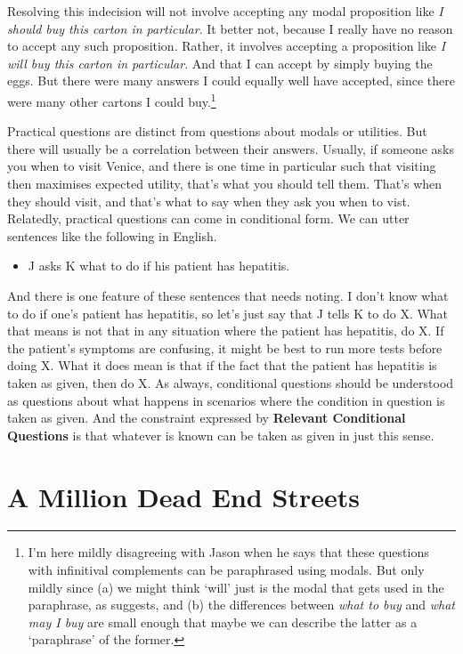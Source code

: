 \documentclass[11pt,]{book}
\providecommand{\tightlist}{%
  \setlength{\itemsep}{0pt}\setlength{\parskip}{0pt}}
\let\rmarkdownfootnote\footnote%
\def\footnote{\protect\rmarkdownfootnote}
\begin{document}
Resolving this indecision will not involve accepting any modal proposition like \emph{I should buy this carton in particular}. It better not, because I really have no reason to accept any such proposition. Rather, it involves accepting a proposition like \emph{I will buy this carton in particular}. And that I can accept by simply buying the eggs. But there were many answers I could equally well have accepted, since there were many other cartons I could buy.\footnote{I'm here mildly disagreeing with Jason \citet[Ch. 5]{Stanley2011} when he says that these questions with infinitival complements can be paraphrased using modals. But only mildly since (a) we might think `will' just is the modal that gets used in the paraphrase, as \citet{Bhatt1999} suggests, and (b) the differences between \emph{what to buy} and \emph{what may I buy} are small enough that maybe we can describe the latter as a `paraphrase' of the former.}

Practical questions are distinct from questions about modals or utilities. But there will usually be a correlation between their answers. Usually, if someone asks you when to visit Venice, and there is one time in particular such that visiting then maximises expected utility, that's what you should tell them. That's when they should visit, and that's what to say when they ask you when to vist. Relatedly, practical questions can come in conditional form. We can utter sentences like the following in English.

\begin{itemize}
\tightlist
\item
  J asks K what to do if his patient has hepatitis.
\end{itemize}

And there is one feature of these sentences that needs noting. I don't know what to do if one's patient has hepatitis, so let's just say that J tells K to do X. What that means is not that in any situation where the patient has hepatitis, do X. If the patient's symptoms are confusing, it might be best to run more tests before doing X. What it does mean is that if the fact that the patient has hepatitis is taken as given, then do X. As always, conditional questions should be understood as questions about what happens in scenarios where the condition in question is taken as given. And the constraint expressed by \textbf{Relevant Conditional Questions} is that whatever is known can be taken as given in just this sense.

\hypertarget{changes}{%
\section{A Million Dead End Streets}\label{changes}}
\end{document}
